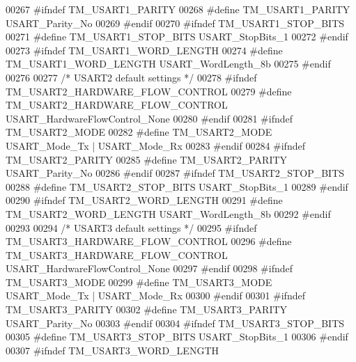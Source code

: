 \begin{DoxyCode}
00267 \textcolor{preprocessor}{#ifndef TM\_USART1\_PARITY}
00268 \textcolor{preprocessor}{#define TM\_USART1\_PARITY                    USART\_Parity\_No}
00269 \textcolor{preprocessor}{#endif}
00270 \textcolor{preprocessor}{#ifndef TM\_USART1\_STOP\_BITS}
00271 \textcolor{preprocessor}{#define TM\_USART1\_STOP\_BITS                 USART\_StopBits\_1}
00272 \textcolor{preprocessor}{#endif}
00273 \textcolor{preprocessor}{#ifndef TM\_USART1\_WORD\_LENGTH}
00274 \textcolor{preprocessor}{#define TM\_USART1\_WORD\_LENGTH               USART\_WordLength\_8b}
00275 \textcolor{preprocessor}{#endif}
00276 
00277 \textcolor{comment}{/* USART2 default settings */}
00278 \textcolor{preprocessor}{#ifndef TM\_USART2\_HARDWARE\_FLOW\_CONTROL}
00279 \textcolor{preprocessor}{#define TM\_USART2\_HARDWARE\_FLOW\_CONTROL     USART\_HardwareFlowControl\_None}
00280 \textcolor{preprocessor}{#endif}
00281 \textcolor{preprocessor}{#ifndef TM\_USART2\_MODE}
00282 \textcolor{preprocessor}{#define TM\_USART2\_MODE                      USART\_Mode\_Tx | USART\_Mode\_Rx}
00283 \textcolor{preprocessor}{#endif}
00284 \textcolor{preprocessor}{#ifndef TM\_USART2\_PARITY}
00285 \textcolor{preprocessor}{#define TM\_USART2\_PARITY                    USART\_Parity\_No}
00286 \textcolor{preprocessor}{#endif}
00287 \textcolor{preprocessor}{#ifndef TM\_USART2\_STOP\_BITS}
00288 \textcolor{preprocessor}{#define TM\_USART2\_STOP\_BITS                 USART\_StopBits\_1}
00289 \textcolor{preprocessor}{#endif}
00290 \textcolor{preprocessor}{#ifndef TM\_USART2\_WORD\_LENGTH}
00291 \textcolor{preprocessor}{#define TM\_USART2\_WORD\_LENGTH               USART\_WordLength\_8b}
00292 \textcolor{preprocessor}{#endif}
00293 
00294 \textcolor{comment}{/* USART3 default settings */}
00295 \textcolor{preprocessor}{#ifndef TM\_USART3\_HARDWARE\_FLOW\_CONTROL}
00296 \textcolor{preprocessor}{#define TM\_USART3\_HARDWARE\_FLOW\_CONTROL     USART\_HardwareFlowControl\_None}
00297 \textcolor{preprocessor}{#endif}
00298 \textcolor{preprocessor}{#ifndef TM\_USART3\_MODE}
00299 \textcolor{preprocessor}{#define TM\_USART3\_MODE                      USART\_Mode\_Tx | USART\_Mode\_Rx}
00300 \textcolor{preprocessor}{#endif}
00301 \textcolor{preprocessor}{#ifndef TM\_USART3\_PARITY}
00302 \textcolor{preprocessor}{#define TM\_USART3\_PARITY                    USART\_Parity\_No}
00303 \textcolor{preprocessor}{#endif}
00304 \textcolor{preprocessor}{#ifndef TM\_USART3\_STOP\_BITS}
00305 \textcolor{preprocessor}{#define TM\_USART3\_STOP\_BITS                 USART\_StopBits\_1}
00306 \textcolor{preprocessor}{#endif}
00307 \textcolor{preprocessor}{#ifndef TM\_USART3\_WORD\_LENGTH}

\end{DoxyCode}

